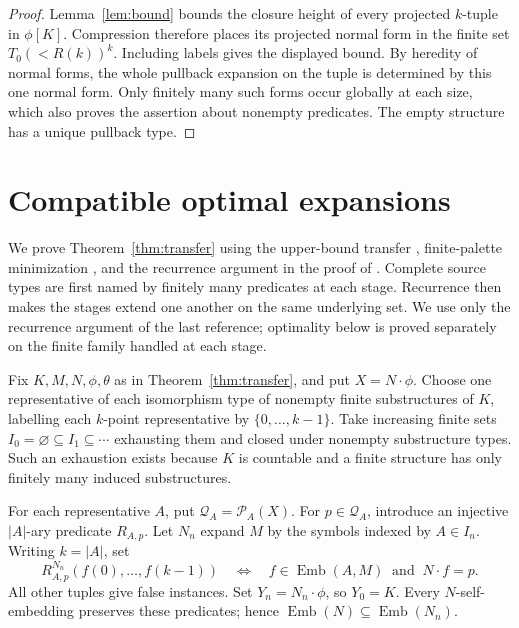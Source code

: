 \documentclass{article}
\numberwithin{equation}{section}
\theoremstyle{definition}
\DeclareMathOperator{\Emb}{Emb}
\begin{document}
\begin{proof}
Lemma~\ref{lem:bound} bounds the closure height of every projected
$k$-tuple in $\phi[K]$. Compression therefore places its projected normal
form in the finite set $T_0(<R(k))^k$. Including labels gives the displayed
bound. By heredity of normal forms, the whole pullback expansion on the
tuple is determined by this one normal form. Only finitely many such
forms occur globally at each size, which also proves the assertion about
nonempty predicates.
The empty structure has a unique pullback type.
\end{proof}
\section{Compatible optimal expansions}\label{sec:extraction}

We prove Theorem~\ref{thm:transfer} using the upper-bound transfer
\cite[Theorem~3.10]{HZ}, finite-palette minimization
\cite[Fact~3.4]{HZ}, and the recurrence argument in the proof of
\cite[Theorem~3.18]{HZ}. Complete source types are first named by finitely
many predicates at each stage. Recurrence then makes the stages extend
one another on the same underlying set. We use only the recurrence
argument of the last reference; optimality below is proved separately on
the finite family handled at each stage.

Fix $K,M,N,\phi,\theta$ as in Theorem~\ref{thm:transfer}, and put
$X=N\cdot\phi$. Choose one representative of each isomorphism type of
nonempty finite substructures of $K$, labelling each $k$-point representative
by $\{0,\ldots,k-1\}$. Take increasing
finite sets $I_0=\varnothing\subseteq I_1\subseteq\cdots$ exhausting
them and closed under nonempty substructure types. Such an exhaustion
exists because $K$ is countable and a finite structure has only finitely
many induced substructures.

For each representative $A$, put $\mathcal Q_A=\mathcal P_A(X)$.
For $p\in\mathcal Q_A$, introduce an injective $|A|$-ary predicate
$R_{A,p}$. Let $N_n$ expand $M$ by the symbols indexed by $A\in I_n$.
Writing $k=|A|$, set
\[
R_{A,p}^{N_n}(f(0),\ldots,f(k-1))
\quad\Longleftrightarrow\quad
f\in\Emb(A,M)\ \text{ and }\ N\cdot f=p.
\]
All other tuples give false instances. Set $Y_n=N_n\cdot\phi$, so
$Y_0=K$. Every $N$-self-embedding preserves these predicates; hence
$\Emb(N)\subseteq\Emb(N_n)$.
\end{document}
